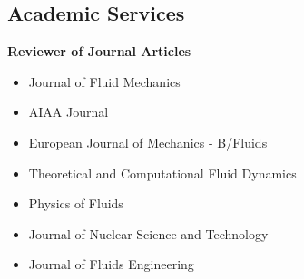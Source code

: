 \documentclass[10pt]{article}
\newenvironment{myitemize}
{ \begin{itemize}
    \setlength{\itemsep}{0pt}
    \setlength{\parskip}{0pt}
    \setlength{\parsep}{0pt}     }
{ \end{itemize}                  }
\begin{document}
\vspace{-0.1in}
\subsection*{Academic Services}
{\bf \color{Blue}Reviewer of Journal Articles}
\vspace{-0.05in}
	\begin{myitemize}
 	\item Journal of Fluid Mechanics
	\item AIAA Journal
	\item European Journal of Mechanics - B/Fluids
 	\item Theoretical and Computational Fluid Dynamics
	\item Physics of Fluids
	\item Journal of Nuclear Science and Technology
	\item Journal of Fluids Engineering

	\end{myitemize}
\end{document}

